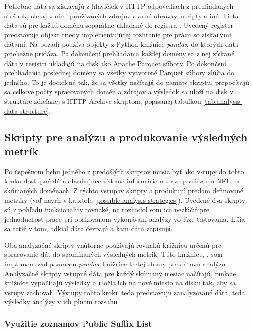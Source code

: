 Potrebné dáta sa získavajú z hlavičiek v HTTP odpovediach z prehliadaných stránok, ale aj z nimi používaných zdrojov ako sú obrázky, skripty a iné.
Tieto dáta sú pre každú doménu separátne ukladané do registra .
Uvedený register predstavuje objekt triedy implementujúcej rozhranie pre prácu so získanými dátami. 
Na pozadí používa  objekty z Python knižnice \textit{pandas}, do ktorých dáta priebežne pridáva.
Po dokončení prehliadania každej domény sa z nej získané dáta v registri ukladajú na disk ako Apache Parquet súbory.
Po dokončení prehliadania poslednej domény sa všetky vytvorené Parquet súbory zlúčia do jedného.
To je docielené tak, že sa všetky načítajú do pamäte skriptu, prepočítajú sa celkové počty spracovaných domén a zdrojov a výsledok sa uloží na disk v štruktúre zdieľanej s HTTP Archive skriptom, popísanej tabuľkou \ref{tab:analysis-data-structure}.

\subsection{Skripty pre analýzu a produkovanie výsledných metrík}
\label{analyze_results}

Po úspešnom behu jedného z predošlých skriptov musia byť ako vstupy do tohto kroku dostupné dáta obsahujúce získané informácie o stave používania NEL na skúmaných doménach.
Z týchto vstupov skripty  a  produkujú predom definované metriky (viď návrh v kapitole \ref{possible-analysis-strategies}).
Uvedené dva skripty sú z pohľadu funkcionality rovnaké, no rozhodol som ich nezlúčiť pre jednoduchosť práce pri opakovanom vykonávaní analýzy vo fáze testovania.
Líšia sa totiž v tom, odkiaľ dáta čerpajú a kam dáta zapisujú.

Oba analyzačné skripty vnútorne používajú rovnakú knižnicu určenú pre spracovanie dát do spomínaných výsledných metrík.
Túto knižnicu, , som implementoval pomocou \textit{pandas}, knižnice tretej strany pre dátovú analýzu.
Analyzačné skripty vstupné dáta pre každý skúmaný mesiac načítajú, funkcie knižnice vypočítajú výsledky a uložia ich na nové miesto na disku tak, aby sa vstupy zachovali.
Výstupy tohto kroku teda predstavujú zanalyzované dáta, teda výsledky analýzy v ich plnom rozsahu.

\subsubsection{Využitie zoznamov Public Suffix List}

